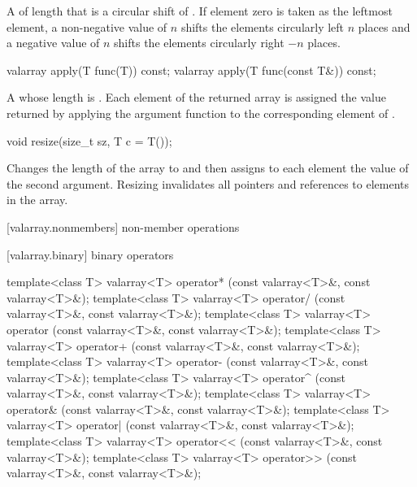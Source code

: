 \begin{itemdescr}
\pnum
\returns
A  of length 
that is a circular shift of . If element zero is taken as
the leftmost element, a non-negative value of $n$ shifts
the elements circularly left $n$ places and a negative
value of $n$ shifts the elements circularly right $-n$ places.
\end{itemdescr}

%
\begin{itemdecl}
valarray apply(T func(T)) const;
valarray apply(T func(const T&)) const;
\end{itemdecl}

\begin{itemdescr}
\pnum
\returns
A  whose length is .
Each element of the returned array is assigned
the value returned by applying the argument function to the
corresponding element of .
\end{itemdescr}

%
\begin{itemdecl}
void resize(size_t sz, T c = T());
\end{itemdecl}

\begin{itemdescr}
\pnum
\effects
Changes the length of the  array to 
and then assigns to each element the value of the second argument.
Resizing invalidates all pointers and references to elements in the array.
\end{itemdescr}

[valarray.nonmembers]{ non-member operations}

[valarray.binary]{ binary operators}

%
%
%
%
%
%
%
%
%
%
\begin{itemdecl}
template<class T> valarray<T> operator*
    (const valarray<T>&, const valarray<T>&);
template<class T> valarray<T> operator/
    (const valarray<T>&, const valarray<T>&);
template<class T> valarray<T> operator%
    (const valarray<T>&, const valarray<T>&);
template<class T> valarray<T> operator+
    (const valarray<T>&, const valarray<T>&);
template<class T> valarray<T> operator-
    (const valarray<T>&, const valarray<T>&);
template<class T> valarray<T> operator^
    (const valarray<T>&, const valarray<T>&);
template<class T> valarray<T> operator&
    (const valarray<T>&, const valarray<T>&);
template<class T> valarray<T> operator|
    (const valarray<T>&, const valarray<T>&);
template<class T> valarray<T> operator<<
    (const valarray<T>&, const valarray<T>&);
template<class T> valarray<T> operator>>
    (const valarray<T>&, const valarray<T>&);
\end{itemdecl}

